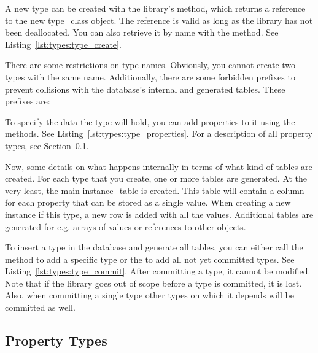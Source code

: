 A new type can be created with the library's  method, which returns a reference to the new \gls{type_class} object. The reference is valid as long as the library has not been deallocated. You can also retrieve it by name with the  method. See Listing~\ref{lst:types:type_create}.



There are some restrictions on type names. Obviously, you cannot create two types with the same name. Additionally, there are some forbidden prefixes to prevent collisions with the database's internal and generated tables. These prefixes are: %

To specify the data the type will hold, you can add properties to it using the  methods. See Listing~\ref{lst:types:type_properties}. For a description of all property types, see Section~\ref{section:types:property_types}.



Now, some details on what happens internally in terms of what kind of tables are created. For each type that you create, one or more tables are generated. At the very least, the main \gls{instance_table} is created. This table will contain a column for each property that can be stored as a single value. When creating a new instance if this type, a new row is added with all the values. Additional tables are generated for e.g. arrays of values or references to other objects.

To insert a type in the database and generate all tables, you can either call the  method to add a specific type or the  to add all not yet committed types. See Listing~\ref{lst:types:type_commit}. After committing a type, it cannot be modified. Note that if the library goes out of scope before a type is committed, it is lost. Also, when committing a single type other types on which it depends will be committed as well.



\subsection{Property Types}
\label{section:types:property_types}

